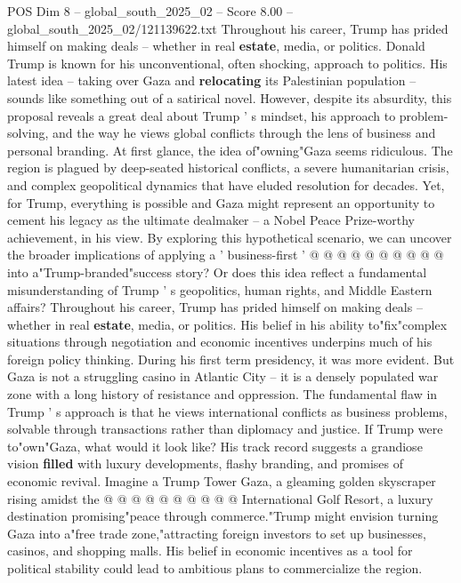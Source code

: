 \begin{textsample}{POS Dim 8 – global\_south\_2025\_02 – Score 8.00 – global\_south\_2025\_02/121139622.txt}  \label{ex:f8_pos_074}
Throughout his career, Trump has prided himself on making deals -- whether in real \textbf{estate}, media, or politics.
Donald Trump is known for his unconventional, often shocking, approach to politics.
His latest idea -- taking over Gaza and \textbf{relocating} its Palestinian population -- sounds like something out of a satirical novel.
However, despite its absurdity, this proposal reveals a great deal about Trump ' s mindset, his approach to problem-solving, and the way he views global conflicts through the lens of business and personal branding.
At first glance, the idea of"owning"Gaza seems ridiculous.
The region is plagued by deep-seated historical conflicts, a severe humanitarian crisis, and complex geopolitical dynamics that have eluded resolution for decades.
Yet, for Trump, everything is possible and Gaza might represent an opportunity to cement his legacy as the ultimate dealmaker -- a Nobel Peace Prize-worthy achievement, in his view.
By exploring this hypothetical scenario, we can uncover the broader implications of applying a ' business-first ' @ @ @ @ @ @ @ @ @ @ into a"Trump-branded"success story?
Or does this idea reflect a fundamental misunderstanding of Trump ' s geopolitics, human rights, and Middle Eastern affairs?
Throughout his career, Trump has prided himself on making deals -- whether in real \textbf{estate}, media, or politics.
His belief in his ability to"fix"complex situations through negotiation and economic incentives underpins much of his foreign policy thinking.
During his first term presidency, it was more evident.
But Gaza is not a struggling casino in Atlantic City -- it is a densely populated war zone with a long history of resistance and oppression.
The fundamental flaw in Trump ' s approach is that he views international conflicts as business problems, solvable through transactions rather than diplomacy and justice.
If Trump were to"own"Gaza, what would it look like?
His track record suggests a grandiose vision \textbf{filled} with luxury developments, flashy branding, and promises of economic revival.
Imagine a Trump Tower Gaza, a gleaming golden skyscraper rising amidst the @ @ @ @ @ @ @ @ @ @ International Golf Resort, a luxury destination promising"peace through commerce."Trump might envision turning Gaza into a"free trade zone,"attracting foreign investors to set up businesses, casinos, and shopping malls.
His belief in economic incentives as a tool for political stability could lead to ambitious plans to commercialize the region.

\end{textsample}
